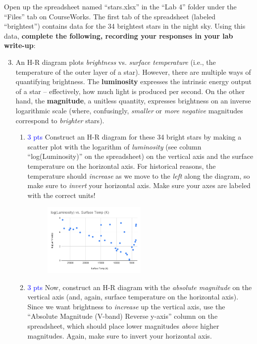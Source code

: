 \documentclass[11pt]{article}
\begin{document}
Open up the spreadsheet named ``stars.xlsx'' in the ``Lab 4'' folder under the ``Files'' tab on CourseWorks. The first tab of the spreadsheet (labeled ``brightest'') contains data for the 34 brightest stars in the night sky. Using this data, \textbf{complete the following, recording your responses in your lab write-up}:
\begin{enumerate}
    \setcounter{enumi}{2}
    
    \item An H-R diagram plots \emph{brightness} vs. \emph{surface temperature} (i.e., the temperature of the outer layer of a star). However, there are multiple ways of quantifying brightness. The \textbf{luminosity} expresses the intrinsic energy output of a star -- effectively, how much light is produced per second. On the other hand, the \textbf{magnitude}, a unitless quantity, expresses brightness on an inverse logarithmic scale (where, confusingly, \emph{smaller} or \emph{more negative} magnitudes correspond to \emph{brighter} stars).
    \begin{enumerate}
        \item \textcolor{blue}{3 pts} Construct an H-R diagram for these 34 bright stars by making a scatter plot with the logarithm of \emph{luminosity} (see column ``log(Luminosity)'' on the spreadsheet) on the vertical axis and the surface temperature on the horizontal axis. For historical reasons, the temperature should \emph{increase} as we move to the \emph{left} along the diagram, so make sure to \emph{invert} your horizontal axis. Make sure your axes are labeled with the correct units!

    \begin{figure}[h!]
        \centering
        \includegraphics[width=0.5\textwidth]{Images/luminosity - brightest.png}
        \label{fig:my_label}
    \end{figure}
        
        \item \textcolor{blue}{3 pts} Now, construct an H-R diagram with the \emph{absolute magnitude} on the vertical axis (and, again, surface temperature on the horizontal axis). Since we want brightness to \emph{increase} up the vertical axis, use the ``Absolute Magnitude (V-band) Reverse y-axis'' column on the spreadsheet, which should place lower magnitudes \emph{above} higher magnitudes. Again, make sure to invert your horizontal axis.


\end{enumerate}
\end{enumerate}
\end{document}
